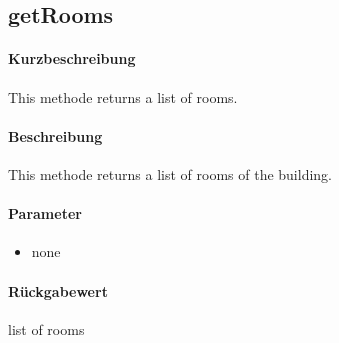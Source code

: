 \subsection{getRooms}%
\paragraph*{Kurzbeschreibung}
This methode returns a list of rooms.
\paragraph*{Beschreibung}
This methode returns a list of rooms of the building.
\paragraph*{Parameter}
\begin{itemize}
    \item none
\end{itemize}
\paragraph*{Rückgabewert}
list of rooms